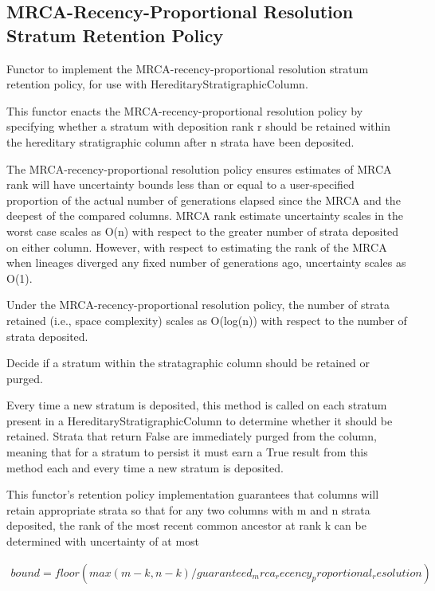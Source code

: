 \subsection{MRCA-Recency-Proportional Resolution Stratum Retention Policy}

Functor to implement the MRCA-recency-proportional resolution stratum
retention policy, for use with HereditaryStratigraphicColumn.

This functor enacts the MRCA-recency-proportional resolution policy by
specifying whether a stratum with deposition rank r should be retained
within the hereditary stratigraphic column after n strata have been
deposited.

The MRCA-recency-proportional resolution policy ensures estimates of MRCA
rank will have uncertainty bounds less than or equal to a user-specified
proportion of the actual number of generations elapsed since the MRCA and
the deepest of the compared columns. MRCA rank estimate uncertainty scales
in the worst case scales as O(n) with respect to the greater number of
strata deposited on either column. However, with respect to estimating the rank of the MRCA when lineages diverged any fixed number of generations ago,
uncertainty scales as O(1).

Under the MRCA-recency-proportional resolution policy, the number of strata
retained (i.e., space complexity) scales as O(log(n)) with respect to the
number of strata deposited.

Decide if a stratum within the stratagraphic column should be
retained or purged.

Every time a new stratum is deposited, this method is called on each
stratum present in a HereditaryStratigraphicColumn to determine whether
it should be retained. Strata that return False are immediately purged
from the column, meaning that for a stratum to persist it must earn a
True result from this method each and every time a new stratum is
deposited.

This functor's retention policy implementation guarantees that columns
will retain appropriate strata so that for any two columns with m and n
strata deposited, the rank of the most recent common ancestor at rank k
can be determined with uncertainty of at most

\begin{align*}
    bound = floor(
        max(m - k, n - k)
        / guaranteed_mrca_recency_proportional_resolution
    )
\end{align*}

